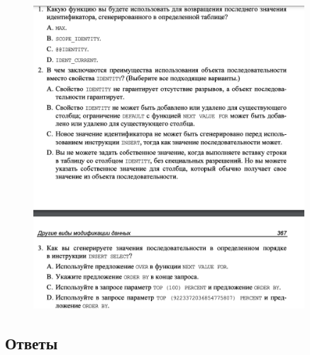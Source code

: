 \begin{figure}[h!]
	\begin{center}
		\includegraphics[width=0.9\textwidth]{img/zakrep25.png}
	\end{center}
	\captionsetup{justification=centering}
\end{figure}
\newpage

\subsection*{Ответы}

